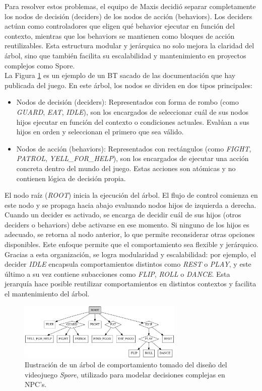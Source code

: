 Para resolver estos problemas, el equipo de Maxis decidió separar completamente los nodos de decisión (deciders) de los nodos de acción (behaviors). Los deciders actúan como controladores que eligen qué behavior ejecutar en función del contexto, mientras que los behaviors se mantienen como bloques de acción reutilizables. Esta estructura modular y jerárquica no solo mejora la claridad del árbol, sino que también facilita su escalabilidad y mantenimiento en proyectos complejos como Spore.\\

La Figura \ref{fig:BT Spore} es un ejemplo de un BT sacado de las documentación \cite{Documentacionspore} que hay publicada del juego.
En este árbol, los nodos se dividen en dos tipos principales:
\begin{itemize}
\item Nodos de decisión (deciders): Representados con forma de rombo (como \textit{GUARD}, \textit{EAT}, \textit{IDLE}), son los encargados de seleccionar cuál de sus nodos hijos ejecutar en función del contexto o condiciones actuales. Evalúan a sus hijos en orden y seleccionan el primero que sea válido.
\item Nodos de acción (behaviors): Representados con rectángulos (como \textit{FIGHT}, \textit{PATROL}, \textit{YELL\_FOR\_HELP}), son los encargados de ejecutar una acción concreta dentro del mundo del juego. Estas acciones son atómicas y no contienen lógica de decisión propia.
\end{itemize}

El nodo raíz (\textit{ROOT}) inicia la ejecución del árbol. El flujo de control comienza en este nodo y se propaga hacia abajo evaluando nodos hijos de izquierda a derecha. Cuando un decider es activado, se encarga de decidir cuál de sus hijos (otros deciders o behaviors) debe activarse en ese momento. Si ninguno de los hijos es adecuado, se retorna al nodo anterior, lo que permite reconsiderar otras opciones disponibles. Este enfoque permite que el comportamiento sea flexible y jerárquico.\\

Gracias a esta organización, se logra modularidad y escalabilidad: por ejemplo, el decider \textit{IDLE} encapsula comportamientos distintos como \textit{REST} o \textit{PLAY}, y este último a su vez contiene subacciones como \textit{FLIP}, \textit{ROLL} o \textit{DANCE}. Esta jerarquía hace posible reutilizar comportamientos en distintos contextos y facilita el mantenimiento del árbol.
\begin{figure}[t]
	\centering
	\includegraphics[width = 0.7\textwidth]{Imagenes/BT_Spoore.png}
	\caption[Árbol de comportamiento de Spore]{Ilustración de un árbol de comportamiento tomado del diseño del videojuego \textit{Spore}, utilizado para modelar decisiones complejas en NPC's.\footnotemark}
	\label{fig:BT Spore}
\end{figure}

